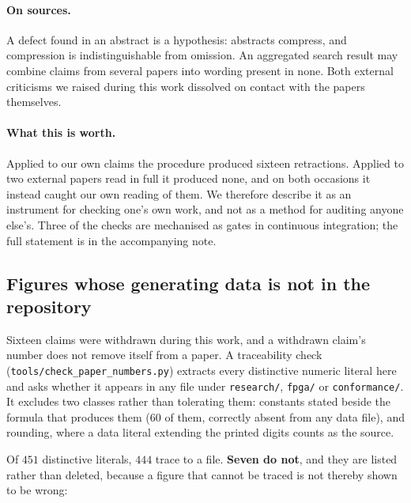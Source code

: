 \documentclass[11pt]{article}
\theoremstyle{definition}
\begin{document}
\paragraph{On sources.} A defect found in an abstract is a hypothesis: abstracts
compress, and compression is indistinguishable from omission. An aggregated
search result may combine claims from several papers into wording present in
none. Both external criticisms we raised during this work dissolved on contact
with the papers themselves.

\paragraph{What this is worth.} Applied to our own claims the procedure produced
sixteen retractions. Applied to two external papers read in full it produced
none, and on both occasions it instead caught our own reading of them. We
therefore describe it as an instrument for checking one's own work, and not as a
method for auditing anyone else's. Three of the checks are mechanised as gates in
continuous integration; the full statement is in the accompanying note.



\subsection{Figures whose generating data is not in the repository}
\label{sec:provenance}

Sixteen claims were withdrawn during this work, and a withdrawn claim's number
does not remove itself from a paper. A traceability check
(\texttt{tools/check\_paper\_numbers.py}) extracts every distinctive numeric
literal here and asks whether it appears in any file under \texttt{research/},
\texttt{fpga/} or \texttt{conformance/}. It excludes two classes rather than
tolerating them: constants stated beside the formula that produces them (60 of
them, correctly absent from any data file), and rounding, where a data literal
extending the printed digits counts as the source.

Of $451$ distinctive literals, $444$ trace to a file. \textbf{Seven do not}, and they
are listed rather than deleted, because a figure that cannot be traced is not
thereby shown to be wrong:
\end{document}

